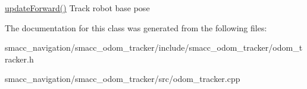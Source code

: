 \hyperlink{classsmacc__odom__tracker_1_1OdomTracker_a7ef4ecc171a6fd37b2ed3c96a58e0659}{update\+Forward()} Track robot base pose 

The documentation for this class was generated from the following files\+:\begin{DoxyCompactItemize}
\item 
smacc\+\_\+navigation/smacc\+\_\+odom\+\_\+tracker/include/smacc\+\_\+odom\+\_\+tracker/odom\+\_\+tracker.\+h\item 
smacc\+\_\+navigation/smacc\+\_\+odom\+\_\+tracker/src/odom\+\_\+tracker.\+cpp\end{DoxyCompactItemize}
